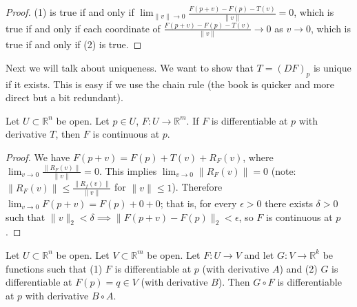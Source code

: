 \begin{proof}

(1) is true if and only if \(\lim_{\lVert v \rVert \to 0} \frac{F(p+ v) - F(p) - T(v)}{ \lVert v \rVert} =0\), which is true if and only if each coordinate of \( \frac{F(p+ v) - F(p) - T(v)}{ \lVert v \rVert} \to 0\) as \(v \to 0\), which is true if and only if (2) is true.

\end{proof}

Next we will talk about uniqueness. We want to show that \(T = (DF)_p\) is unique if it exists. This is easy if we use the chain rule (the book is quicker and more direct but a bit redundant).

\begin{proposition}\label{ra.diff.imp.cont.mult}

Let \(U \subset \mathbb{R}^n\) be open. Let \(p \in U\), \(F: U \to \mathbb{R}^m\). If \(F\) is differentiable at \(p\) with derivative \(T\), then \(F\) is continuous at \(p\).

\end{proposition}

\begin{proof}

We have \(F(p+v) = F(p) + T(v) + R_F(v)\), where \(\lim_{v \to 0} \frac{ \lVert R_F(v) \rVert}{\lVert v \rVert} = 0\). This implies \(\lim_{v \to 0} \lVert R_F(v) \rVert = 0\) (note: \(\lVert R_F(v) \rVert \leq \frac{ \lVert R_f(v) \rVert}{\lVert v \rVert}\) for \(\lVert v \rVert \leq 1\)). Therefore \(\lim_{ v\to 0} F(p+v) = F(p) + 0 + 0\); that is, for every \(\epsilon >0\) there exists \(\delta > 0\) such that \(\lVert v \rVert_2 < \delta \implies \lVert F(p + v) - F(p) \rVert_2 < \epsilon\), so \(F\) is continuous at \(p\).

\end{proof}

\begin{theorem}\label{ra.thm.multi.chain.rule}

Let \(U \subset \mathbb{R}^n\) be open. Let \(V \subset \mathbb{R}^m\) be open. Let \(F: U \to V\) and let \(G: V \to \mathbb{R}^k\) be functions such that (1) \(F\) is differentiable at \(p\) (with derivative \(A\)) and (2) \(G\) is differentiable at \(F(p) = q \in V\) (with derivative \(B\)). Then \(G \circ F\) is differentiable at \(p\) with derivative \(B \circ A\). 

\end{theorem}

